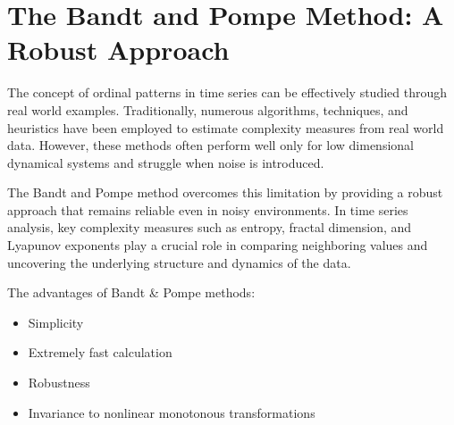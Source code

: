 
\section{The Bandt and Pompe Method: A Robust Approach} \label{Sec:BP method}

The concept of ordinal patterns in time series can be effectively studied through real world examples. 
Traditionally, numerous algorithms, techniques, and heuristics have been employed to estimate complexity measures from real world data. 
However, these methods often perform well only for low dimensional dynamical systems and struggle when noise is introduced.

The Bandt and Pompe method overcomes this limitation by providing a robust approach that remains reliable even in noisy environments. 
In time series analysis, key complexity measures such as entropy, fractal dimension, 
and Lyapunov exponents play a crucial role in comparing neighboring values and uncovering the underlying structure and dynamics of the data.

The advantages of Bandt \& Pompe methods:
\begin{itemize}
	\item Simplicity
	\item Extremely fast calculation
	\item Robustness
	\item Invariance to nonlinear monotonous transformations
\end{itemize}	

